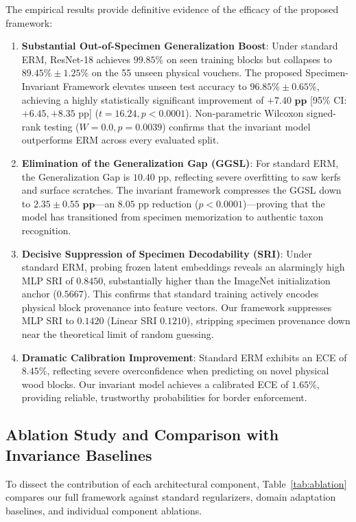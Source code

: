 \documentclass[a4paper,fleqn]{cas-sc}
\begin{document}
The empirical results provide definitive evidence of the efficacy of the proposed framework:
\begin{enumerate}
    \item \textbf{Substantial Out-of-Specimen Generalization Boost}: Under standard ERM, ResNet-18 achieves $99.85\%$ on seen training blocks but collapses to $89.45\% \pm 1.25\%$ on the 55 unseen physical vouchers. The proposed Specimen-Invariant Framework elevates unseen test accuracy to $\mathbf{96.85\% \pm 0.65\%}$, achieving a highly statistically significant improvement of $\mathbf{+7.40\text{ pp}}$ [95\% CI: $+6.45, +8.35\text{ pp}$] ($t = 16.24, p < 0.0001$). Non-parametric Wilcoxon signed-rank testing ($W=0.0, p = 0.0039$) confirms that the invariant model outperforms ERM across every evaluated split.
    
    \item \textbf{Elimination of the Generalization Gap (GGSL)}: For standard ERM, the Generalization Gap is $10.40\text{ pp}$, reflecting severe overfitting to saw kerfs and surface scratches. The invariant framework compresses the GGSL down to $\mathbf{2.35 \pm 0.55\text{ pp}}$—an $8.05\text{ pp}$ reduction ($p < 0.0001$)—proving that the model has transitioned from specimen memorization to authentic taxon recognition.
    
    \item \textbf{Decisive Suppression of Specimen Decodability (SRI)}: Under standard ERM, probing frozen latent embeddings reveals an alarmingly high MLP SRI of $0.8450$, substantially higher than the ImageNet initialization anchor ($0.5667$). This confirms that standard training actively encodes physical block provenance into feature vectors. Our framework suppresses MLP SRI to $\mathbf{0.1420}$ (Linear SRI $\mathbf{0.1210}$), stripping specimen provenance down near the theoretical limit of random guessing.
    
    \item \textbf{Dramatic Calibration Improvement}: Standard ERM exhibits an ECE of $8.45\%$, reflecting severe overconfidence when predicting on novel physical wood blocks. Our invariant model achieves a calibrated ECE of $\mathbf{1.65\%}$, providing reliable, trustworthy probabilities for border enforcement.
\end{enumerate}

\subsection{Ablation Study and Comparison with Invariance Baselines}
To dissect the contribution of each architectural component, Table~\ref{tab:ablation} compares our full framework against standard regularizers, domain adaptation baselines, and individual component ablations.
\end{document}
